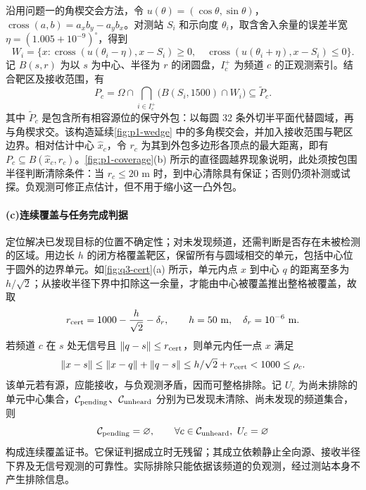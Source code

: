 沿用问题一的角楔交会方法，令 $u(\theta)=(\cos\theta,\sin\theta)$，$\operatorname{cross}(a,b)=a_xb_y-a_yb_x$。对测站 $S_i$ 和示向度 $\theta_i$，取含舍入余量的误差半宽 $\eta=(1.005+10^{-9})^\circ$，得到
\begin{equation}\label{eq:q3-wedge}
 W_i=\{x:\operatorname{cross}(u(\theta_i-\eta),x-S_i)\ge0,\quad
          \operatorname{cross}(u(\theta_i+\eta),x-S_i)\le0\}.
\end{equation}
记 $B(s,r)$ 为以 $s$ 为中心、半径为 $r$ 的闭圆盘，$I_c^+$ 为频道 $c$ 的正观测索引。结合靶区及接收范围，有
\begin{equation}\label{eq:q3-region}
 P_c=\Omega\cap\bigcap_{i\in I_c^+}\bigl(B(S_i,1500)\cap W_i\bigr)
       \subseteq\widetilde P_c .
\end{equation}
其中 $\widetilde P_c$ 是包含所有相容源位的保守外包：以每圆 32 条外切半平面代替圆域，再与角楔求交。该构造延续\cref{fig:p1-wedge} 中的多角楔交会，并加入接收范围与靶区边界。相对估计中心 $\hat x_c$，令 $r_c$ 为其到外包多边形各顶点的最大距离，即有 $P_c\subseteq B(\hat x_c,r_c)$。\cref{fig:p1-coverage}(b) 所示的直径圆越界现象说明，此处须按包围半径判断清除条件：当 $r_c\le20$ m 时，到中心清除具有保证；否则仍须补测或试探。负观测可修正点估计，但不用于缩小这一凸外包。

\paragraph{\textbf{(c)}\hspace{0.2em}连续覆盖与任务完成判据}
定位解决已发现目标的位置不确定性；对未发现频道，还需判断是否存在未被检测的区域。用边长 $h$ 的闭方格覆盖靶区，保留所有与圆域相交的单元，包括中心位于圆外的边界单元。如\cref{fig:q3-cert}(a) 所示，单元内点 $x$ 到中心 $q$ 的距离至多为 $h/\sqrt2$；从接收半径下界中扣除这一余量，才能由中心被覆盖推出整格被覆盖，故取
\begin{equation}\label{eq:q3-cert-radius}
 r_{\rm cert}=1000-\frac h{\sqrt2}-\delta_r,\qquad
 h=50\ \mathrm{m},\quad\delta_r=10^{-6}\ \mathrm{m}.
\end{equation}
若频道 $c$ 在 $s$ 处无信号且 $\|q-s\|\le r_{\rm cert}$，则单元内任一点 $x$ 满足
\begin{equation}\label{eq:q3-cert-proof}
 \|x-s\|\le\|x-q\|+\|q-s\|
 \le h/\sqrt2+r_{\rm cert}<1000\le\rho_c.
\end{equation}
该单元若有源，应能接收，与负观测矛盾，因而可整格排除。记 $U_c$ 为尚未排除的单元中心集合，$\mathcal C_{\rm pending}$、$\mathcal C_{\rm unheard}$ 分别为已发现未清除、尚未发现的频道集合，则
\begin{equation}\label{eq:q3-stop}
 \mathcal C_{\rm pending}=\varnothing,\qquad
 \forall c\in \mathcal C_{\rm unheard},\ U_c=\varnothing
\end{equation}
构成连续覆盖证书。它保证判据成立时无残留；其成立依赖静止全向源、接收半径下界及无信号观测的可靠性。实际排除只能依据该频道的负观测，经过测站本身不产生排除信息。

